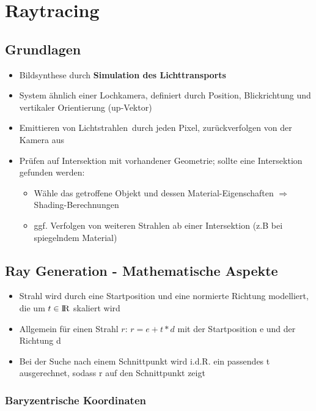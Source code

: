 \section{Raytracing}%
\label{rt:sec:raytracing}

\subsection{Grundlagen}%
\label{rt:sub:grundlagen}

\begin{itemize}
	\item Bildsynthese durch \textbf{Simulation des Lichttransports}
	\item System ähnlich einer Lochkamera, definiert durch Position, Blickrichtung und vertikaler Orientierung (up-Vektor)
	\item Emittieren von \glqq Lichtstrahlen\grqq\ durch jeden Pixel, zurückverfolgen von der Kamera aus
	\item Prüfen auf Intersektion mit vorhandener Geometrie; sollte eine Intersektion gefunden werden:
		\begin{itemize}
			\item Wähle das getroffene Objekt und dessen Material-Eigenschaften $\Rightarrow$ Shading-Berechnungen
			\item ggf. Verfolgen von weiteren Strahlen ab einer Intersektion (z.B bei spiegelndem Material)
		\end{itemize}
\end{itemize}

\subsection{Ray Generation - Mathematische Aspekte}%
\label{rt:sub:ray_generation_mathematische_aspekte}

\begin{itemize}
	\item Strahl wird durch eine Startposition und eine normierte Richtung modelliert, die um $t \in {\rm I\!R}$ skaliert wird
	\item Allgemein für einen Strahl $r$: $r = e + t * d$ mit der Startposition e und der Richtung d
	\item Bei der Suche nach einem Schnittpunkt wird i.d.R. ein passendes t ausgerechnet, sodass r auf den Schnittpunkt zeigt
\end{itemize}

\subsubsection{Baryzentrische Koordinaten}%
\label{rt:ssub:baryzentrische_koordinaten}

